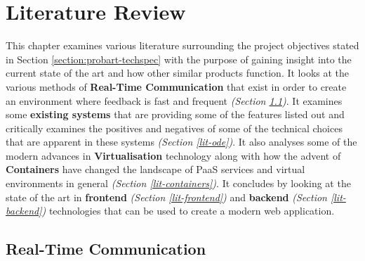 
\chapter{Literature Review} \label{lit}

This chapter examines various literature surrounding the project objectives stated in Section \ref{section:probart-techspec} with the purpose of gaining insight into the current state of the art and how other similar products function. It looks at the various methods of \textbf{Real-Time Communication} that exist in order to create an environment where feedback is fast and frequent \textit{(Section \ref{lit-rtc})}. It examines some \textbf{existing systems} that are providing some of the features listed out and critically examines the positives and negatives of some of the technical choices that are apparent in these systems \textit{(Section \ref{lit-ode})}. It also analyses some of the modern advances in \textbf{Virtualisation} technology along with how the advent of \textbf{Containers} have changed the landscape of PaaS services and virtual environments in general \textit{(Section \ref{lit-containers})}. It concludes by looking at the state of the art in \textbf{frontend} \textit{(Section \ref{lit-frontend})} and \textbf{backend} \textit{(Section \ref{lit-backend})} technologies that can be used to create a modern web application. 

\section{Real-Time Communication} \label{lit-rtc}

